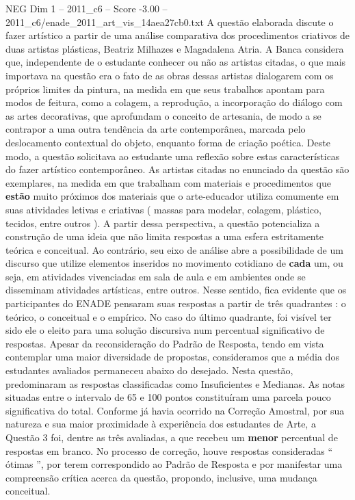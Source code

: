 \begin{textsample}{NEG Dim 1 – 2011\_c6 – Score -3.00 – 2011\_c6/enade\_2011\_art\_vis\_14aea27cb0.txt}
A questão elaborada discute o fazer artístico a partir de uma análise comparativa dos procedimentos criativos de duas artistas plásticas, Beatriz Milhazes e Magadalena Atria.
A Banca considera que, independente de o estudante conhecer ou não as artistas citadas, o que mais importava na questão era o fato de as obras dessas artistas dialogarem com os próprios limites da pintura, na medida em que seus trabalhos apontam para modos de feitura, como a colagem, a reprodução, a incorporação do diálogo com as artes decorativas, que aprofundam o conceito de artesania, de modo a se contrapor a uma outra tendência da arte contemporânea, marcada pelo deslocamento contextual do objeto, enquanto forma de criação poética.
Deste modo, a questão solicitava ao estudante uma reflexão sobre estas características do fazer artístico contemporâneo.
As artistas citadas no enunciado da questão são exemplares, na medida em que trabalham com materiais e procedimentos que \textbf{estão} muito próximos dos materiais que o arte-educador utiliza comumente em suas atividades letivas e criativas ( massas para modelar, colagem, plástico, tecidos, entre outros ).
A partir dessa perspectiva, a questão potencializa a construção de uma ideia que não limita respostas a uma esfera estritamente teórica e conceitual.
Ao contrário, seu eixo de análise abre a possibilidade de um discurso que utilize elementos inseridos no movimento cotidiano de \textbf{cada} um, ou seja, em atividades vivenciadas em sala de aula e em ambientes onde se disseminam atividades artísticas, entre outros.
Nesse sentido, fica evidente que os participantes do ENADE pensaram suas respostas a partir de três quadrantes : o teórico, o conceitual e o empírico.
No caso do último quadrante, foi visível ter sido ele o eleito para uma solução discursiva num percentual significativo de respostas.
Apesar da reconsideração do Padrão de Resposta, tendo em vista contemplar uma maior diversidade de propostas, consideramos que a média dos estudantes avaliados permaneceu abaixo do desejado.
Nesta questão, predominaram as respostas classificadas como Insuficientes e Medianas.
As notas situadas entre o intervalo de 65 e 100 pontos constituíram uma parcela pouco significativa do total.
Conforme já havia ocorrido na Correção Amostral, por sua natureza e sua maior proximidade à experiência dos estudantes de Arte, a Questão 3 foi, dentre as três avaliadas, a que recebeu um \textbf{menor} percentual de respostas em branco.
No processo de correção, houve respostas consideradas “ ótimas ”, por terem correspondido ao Padrão de Resposta e por manifestar uma compreensão crítica acerca da questão, propondo, inclusive, uma mudança conceitual.

\end{textsample}
